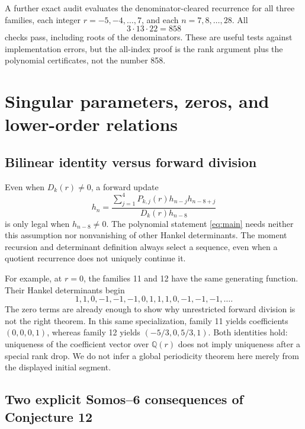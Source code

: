 \documentclass[11pt,letterpaper]{article}
\numberwithin{equation}{section}
\theoremstyle{definition}
\newcommand{\Q}{\mathbb Q}
\begin{document}
A further exact audit evaluates the denominator-cleared recurrence for
all three families, each integer \(r=-5,-4,\ldots,7\), and each
\(n=7,8,\ldots,28\). All
\begin{equation}
 3\cdot13\cdot22=858
\end{equation}
checks pass, including roots of the denominators. These are useful tests
against implementation errors, but the all-index proof is the rank argument
plus the polynomial certificates, not the number 858.

\section{Singular parameters, zeros, and lower-order relations}
\label{sec:singular}

\subsection{Bilinear identity versus forward division}

Even when \(D_k(r)\ne0\), a forward update
\begin{equation}
 h_n=\frac{\sum_{j=1}^4P_{k,j}(r)h_{n-j}h_{n-8+j}}
              {D_k(r)h_{n-8}}
 \label{eq:forward}
\end{equation}
is only legal when \(h_{n-8}\ne0\). The polynomial statement
\eqref{eq:main} needs neither this assumption nor nonvanishing of other
Hankel determinants. The moment recursion and determinant definition always
select a sequence, even when a quotient recurrence does not uniquely
continue it.

For example, at \(r=0\), the families 11 and 12 have the same generating
function. Their Hankel determinants begin
\begin{equation}
 1,1,0,-1,-1,-1,0,1,1,1,0,-1,-1,-1,\ldots.
\end{equation}
The zero terms are already enough to show why unrestricted forward division
is not the right theorem. In this same specialization, family 11 yields
coefficients \((0,0,0,1)\), whereas family 12 yields
\((-5/3,0,5/3,1)\). Both identities hold: uniqueness of the coefficient
vector over \(\Q(r)\) does not imply uniqueness after a special rank drop.
We do not infer a global periodicity theorem here merely from the displayed
initial segment.

\subsection{Two explicit Somos--6 consequences of Conjecture 12}
\end{document}
